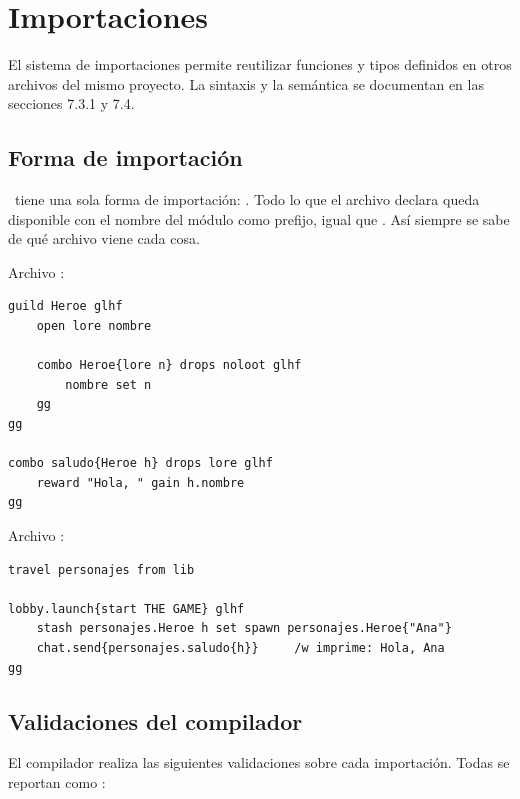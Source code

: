 \newpage
\section{Importaciones}
\label{sec:importaciones}

El sistema de importaciones permite reutilizar funciones y tipos definidos en otros archivos del mismo proyecto. La sintaxis y la semántica se documentan en las secciones 7.3.1 y 7.4.

\subsection{Forma de importación}

\ggez\ tiene una sola forma de importación: . Todo lo que el archivo declara queda disponible con el nombre del módulo como prefijo, igual que . Así siempre se sabe de qué archivo viene cada cosa.

Archivo :
\begin{lstlisting}
guild Heroe glhf
    open lore nombre

    combo Heroe{lore n} drops noloot glhf
        nombre set n
    gg
gg

combo saludo{Heroe h} drops lore glhf
    reward "Hola, " gain h.nombre
gg
\end{lstlisting}

Archivo :
\begin{lstlisting}
travel personajes from lib

lobby.launch{start THE GAME} glhf
    stash personajes.Heroe h set spawn personajes.Heroe{"Ana"}
    chat.send{personajes.saludo{h}}     /w imprime: Hola, Ana
gg
\end{lstlisting}

\subsection{Validaciones del compilador}

El compilador realiza las siguientes validaciones sobre cada importación. Todas se reportan como :


